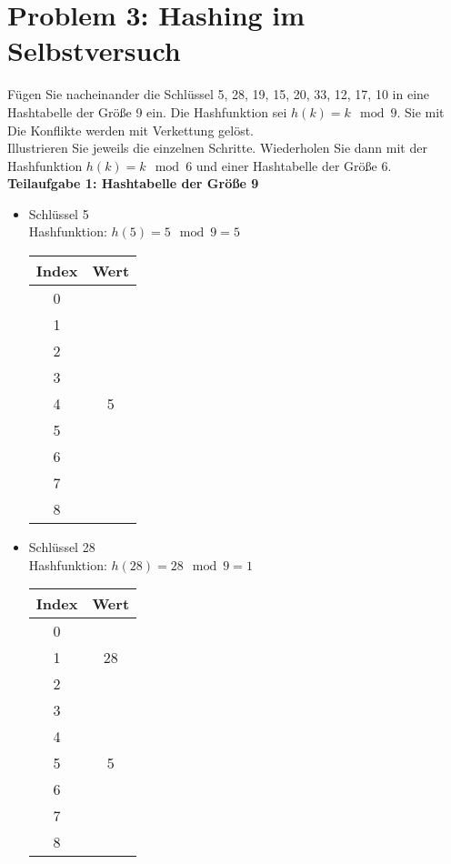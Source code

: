 \section*{{Problem 3: Hashing im Selbstversuch}} 

Fügen Sie nacheinander die Schlüssel 5, 28, 19, 15, 20, 33, 12, 17, 10 in eine Hashtabelle der Größe 9 ein. Die Hashfunktion sei $h(k) = k \mod 9$. Sie mit Die Konflikte werden mit Verkettung gelöst.\\
Illustrieren Sie jeweils die einzelnen Schritte. Wiederholen Sie dann mit der Hashfunktion $h(k) = k \mod 6$ und einer Hashtabelle der Größe 6.\\

\noindent
\textbf{Teilaufgabe 1: Hashtabelle der Größe 9}

\begin{multicols}{2}
\begin{itemize}
\item Schlüssel 5\\
Hashfunktion: $h(5) = 5 \mod 9=5$

\begin{center}
\begin{tabular}{c|c}
Index & Wert \\
\hline
0 & \\
1 & \\
2 & \\
3 & \\
4 & 5\\
5 & \\
6 & \\
7 & \\
8 & \\
\end{tabular}
\end{center}

\item Schlüssel 28\\
Hashfunktion: $h(28) = 28 \mod 9 = 1$

\begin{center}
\begin{tabular}{c|c}
Index & Wert \\
\hline
0 & \\
1 & 28\\
2 & \\
3 & \\
4 & \\
5 & 5\\
6 & \\
7 & \\
8 & \\
\end{tabular}
\end{center}


\end{itemize}
\end{multicols}
